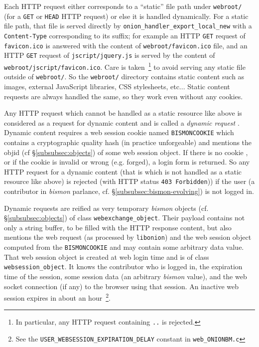 Each HTTP request   either
corresponds to a ``static'' file path under \texttt{webroot/} (for a
\texttt{GET} or \texttt{HEAD} HTTP request) or else it is handled
dynamically. For a static file path, that file is served directly by
\texttt{onion\_handler\_export\_local\_new} with a
\texttt{Content-Type} corresponding to its suffix; for example an HTTP
\texttt{GET} request of \texttt{favicon.ico} is answered with the
content of \texttt{webroot/favicon.ico} file, and an HTTP \texttt{GET}
request of \texttt{jscript/jquery.js} is served by the content of
\texttt{webroot/jscript/favicon.ico}. Care is taken~\footnote{In
  particular, any HTTP request containing \texttt{..} is rejected.} to
avoid serving any static file outside of \texttt{webroot/}. So the
\texttt{webroot/} directory contains static content such as images,
external JavaScript libraries, CSS stylesheets, etc... Static content
requests are always handled the same, so they work even without any
cookies.  

Any HTTP request which cannot be handled as a static resource like
above is considered as a request for dynamic content and is called a
\emph{dynamic request}  . Dynamic content requires a web session 
 cookie  
named \texttt{BISMONCOOKIE} which contains a cryptographic quality
hash (in practice unforgeable) and mentions the objid 
(cf §\ref{subsubsec:objects}) of some web session object. If there is
no cookie , or if the cookie is invalid or wrong
(e.g. forged), a login  form is returned. So any HTTP
request for a dynamic content (that is which is not handled as a
static resource like above) is rejected (with HTTP status \texttt{403
  Forbidden})) if the user (a  contributor in
\emph{bismon} parlance, cf. §\ref{subsubsec:bismon-evolving}) is not
logged in.

Dynamic requests are reified as very temporary \emph{bismon} objects
(cf. §\ref{subsubsec:objects}) of class
\texttt{webexchange\_object}. Their payload contains not only a string
buffer, to be filled with the HTTP response content, but also mentions
the web request (as processed by \texttt{libonion}) and the web
session object computed from the \texttt{BISMONCOOKIE} and may contain
some arbitrary data value. That web session object is created at web
login time and is of class \texttt{websession\_object}. It knows the
contributor who is logged in, the expiration time of the session, some
session data (an arbitrary \emph{bismon} value), and the web socket
 connection (if any) to the browser using that
session. An inactive web session expires in about an
hour~\footnote{See the \texttt{USER\_WEBSESSION\_EXPIRATION\_DELAY}
  constant in \texttt{web\_ONIONBM.c}}.

